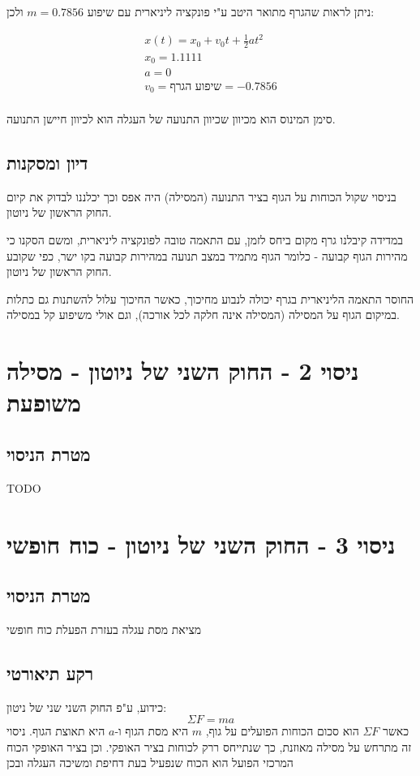 \documentclass[14pt]{extarticle}
\begin{document}
ניתן לראות שהגרף מתואר היטב ע"י פונקציה ליניארית עם שיפוע $m=0.7856$ ולכן:
\begin{center}
\begin{equation}
\begin{aligned}
    x(t) = x_0 + v_0 t + \frac{1}{2} a t^2 \\
    x_0 = 1.1111 \\
    a = 0 \\
    v_0 = \textbf{שיפוע הגרף} = -0.7856 \\
\end{aligned}
\end{equation}
\end{center}
סימן המינוס הוא מכיוון שכיוון התנועה של העגלה הוא לכיוון חיישן התנועה.

\subsection{דיון ומסקנות}
בניסוי שקול הכוחות על הגוף בציר התנועה (המסילה) היה אפס וכך יכלננו לבדוק את קיום החוק הראשון של ניוטון.

במדידה קיבלנו גרף מקום ביחס לזמן, עם התאמה טובה לפונקציה ליניארית,  ומשם הסקנו כי מהירות הגוף קבועה - כלומר הגוף מתמיד במצב תנועה במהירות קבועה בקו ישר, כפי שקובע החוק הראשון של ניוטון.

החוסר התאמה הליניארית בגרף יכולה לנבוע מחיכוך, כאשר החיכוך עלול להשתנות גם כתלות במיקום הגוף על המסילה (המסילה אינה חלקה לכל אורכה), וגם אולי משיפוע קל במסילה.

\section*{ניסוי 2 - החוק השני של ניוטון - מסילה משופעת}
\subsection*{מטרת הניסוי}
TODO

\section*{ניסוי 3 - החוק השני של ניוטון - כוח  חופשי}
\subsection*{מטרת הניסוי}
מציאת מסת עגלה בעזרת הפעלת כוח חופשי
\subsection*{רקע תיאורטי}   
כידוע, ע"פ החוק השני שני של ניטון:
\begin{equation}
\Sigma F = m a
\end{equation}
כאשר $\Sigma F$ הוא סכום הכוחות הפועלים על גוף, $m$ היא מסת הגוף ו-$a$ היא תאוצת הגוף.
ניסוי זה מתרחש על מסילה מאוזנת, כך שנתייחס ררק לכוחות בציר האופקי.
וכן בציר האופקי הכוח המרכזי הפועל הוא הכוח שנפעיל בעת דחיפת ומשיכה העגלה ובכן
\end{document}
